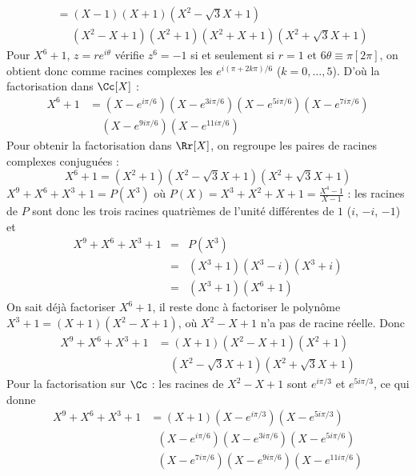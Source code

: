 {\begin{enumerate}
{$$\begin{array}{rl}
 &=(X-1)(X+1)(X^2-\sqrt{3}X+1)\\
 &\ \ \ \ \ \ (X^2-X+1)(X^2+1)(X^2+X+1)(X^2+\sqrt{3}X+1)
\end{array}$$
Pour $X^6+1$, $z=re^{i\theta}$ vérifie $z^{6}=-1$ si et seulement 
si $r=1$ et $6\theta\equiv \pi [2\pi]$, on obtient donc comme racines 
complexes les $e^{i(\pi+2k\pi)/6}$ ($k=0,\ldots,5$). D'où la factorisation dans $\Cc[X]$ :
$$\begin{array}{rl}
X^6+1 &=(X-e^{i\pi/6})(X-e^{3i\pi/6})(X-e^{5i\pi/6})(X-e^{7i\pi/6})\\
  &\ \ \ \ \ (X-e^{9i\pi/6})(X-e^{11i\pi/6})
\end{array}$$
Pour obtenir la factorisation dans $\Rr[X]$, on regroupe les paires de racines complexes conjuguées :
$$X^6+1=(X^2+1)(X^2-\sqrt{3}X+1)(X^2+\sqrt{3}X+1)$$
$X^9+X^6+X^3+1=P(X^3)$ où $P(X)=X^3+X^2+X+1=\frac{X^4-1}{X-1}$ : 
les racines de $P$ sont donc les trois racines quatrièmes de l'unité 
différentes de $1$ ($i$, $-i$, $-1$) et 
$$\begin{array}{rcl}
X^9+X^6+X^3+1&=&P(X^3)\\
 &=&(X^3+1)(X^3-i)(X^3+i)\\
 &=&(X^3+1)(X^6+1)
\end{array}$$
On sait déjà factoriser $X^6+1$, il reste donc à factoriser le polynôme 
$X^3+1=(X+1)(X^2-X+1)$, où $X^2-X+1$ n'a pas de racine réelle. Donc
$$\begin{array}{rl}
X^9+X^6+X^3+1&=(X+1)(X^2-X+1)(X^2+1)\\
 & \ \ \ \ \ (X^2-\sqrt{3}X+1)(X^2+\sqrt{3}X+1)
\end{array}$$
Pour la factorisation sur $\Cc$ : les racines de $X^2-X+1$ sont $e^{i\pi/3}$ et $e^{5i\pi/3}$, ce qui donne
$$\begin{array}{rl}
X^9+X^6+X^3+1&=(X+1)(X-e^{i\pi/3})(X-e^{5i\pi/3})\\
 &\ \ \ (X-e^{i\pi/6})(X-e^{3i\pi/6})(X-e^{5i\pi/6})\\
 &\ \ \ (X-e^{7i\pi/6})(X-e^{9i\pi/6})(X-e^{11i\pi/6})
\end{array}$$
}
\end{enumerate}
}
